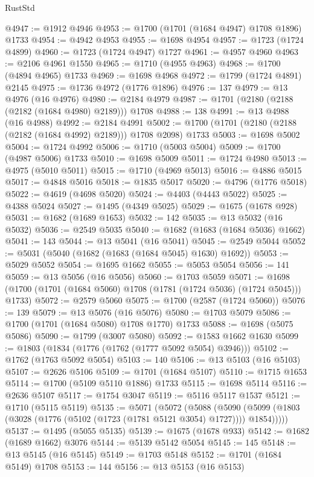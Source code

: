 \begin{lexlean}{RustStd}
\begin{coremodule}
@4947 := @1912 @4946
@4953 := @1700 (@1701 (@1684 @4947) @1708 @1896) @1733
@4954 := @4942 @4953
@4955 := @1698 @4954
@4957 := @1723 (@1724 @4899)
@4960 := @1723 (@1724 @4947) @1727
@4961 := @4957 @4960
@4963 := @2106 @4961 @1550
@4965 := @1710 (@4955 @4963)
@4968 := @1700 (@4894 @4965) @1733
@4969 := @1698 @4968
@4972 := @1799 (@1724 @4891) @2145
@4975 := @1736 @4972 (@1776 @1896)
@4976 := 137
@4979 := @13 @4976 (@16 @4976)
@4980 := @2184 @4979
@4987 := @1701 (@2180 (@2188 (@2182 (@1684 @4980) @2189))) @1708
@4988 := 138
@4991 := @13 @4988 (@16 @4988)
@4992 := @2184 @4991
@5002 := @1700 (@1701 (@2180 (@2188 (@2182 (@1684 @4992) @2189))) @1708 @2098) @1733
@5003 := @1698 @5002
@5004 := @1724 @4992
@5006 := @1710 (@5003 @5004)
@5009 := @1700 (@4987 @5006) @1733
@5010 := @1698 @5009
@5011 := @1724 @4980
@5013 := @4975 (@5010 @5011)
@5015 := @1710 (@4969 @5013)
@5016 := @4886 @5015
@5017 := @4848 @5016
@5018 := @1835 @5017
@5020 := @4796 (@1776 @5018)
@5022 := @4619 (@4698 @5020)
@5024 := @4403 (@4443 @5022)
@5025 := @4388 @5024
@5027 := @1495 (@4349 @5025)
@5029 := @1675 (@1678 @928)
@5031 := @1682 (@1689 @1653)
@5032 := 142
@5035 := @13 @5032 (@16 @5032)
@5036 := @2549 @5035
@5040 := @1682 (@1683 (@1684 @5036) @1662)
@5041 := 143
@5044 := @13 @5041 (@16 @5041)
@5045 := @2549 @5044
@5052 := @5031 (@5040 (@1682 (@1683 (@1684 @5045) @1630) @1692))
@5053 := @5029 @5052
@5054 := @1695 @1662
@5055 := @5053 @5054
@5056 := 141
@5059 := @13 @5056 (@16 @5056)
@5060 := @1703 @5059
@5071 := @1698 (@1700 (@1701 (@1684 @5060) @1708 (@1781 (@1724 @5036) (@1724 @5045))) @1733)
@5072 := @2579 @5060
@5075 := @1700 (@2587 (@1724 @5060))
@5076 := 139
@5079 := @13 @5076 (@16 @5076)
@5080 := @1703 @5079
@5086 := @1700 (@1701 (@1684 @5080) @1708 @1770) @1733
@5088 := @1698 (@5075 @5086)
@5090 := @1799 (@3007 @5080)
@5092 := @1583 @1662 @1630
@5099 := @1803 (@1834 (@1776 (@1762 (@1777 @5092 @5054) @3946)))
@5102 := @1762 (@1763 @5092 @5054)
@5103 := 140
@5106 := @13 @5103 (@16 @5103)
@5107 := @2626 @5106
@5109 := @1701 (@1684 @5107)
@5110 := @1715 @1653
@5114 := @1700 (@5109 @5110 @1886) @1733
@5115 := @1698 @5114
@5116 := @2636 @5107
@5117 := @1754 @3047
@5119 := @5116 @5117 @1537
@5121 := @1710 (@5115 @5119)
@5135 := @5071
    (@5072
      (@5088
        (@5090 (@5099 (@1803 (@3028 (@1776 (@5102 (@1723 (@1781 @5121 @3054) @1727)))) @1854)))))
@5137 := @1495 (@5055 @5135)
@5139 := @1675 (@1678 @933)
@5142 := @1682 (@1689 @1662) @3076
@5144 := @5139 @5142 @5054
@5145 := 145
@5148 := @13 @5145 (@16 @5145)
@5149 := @1703 @5148
@5152 := @1701 (@1684 @5149) @1708
@5153 := 144
@5156 := @13 @5153 (@16 @5153)

\end{coremodule}
\end{lexlean}
